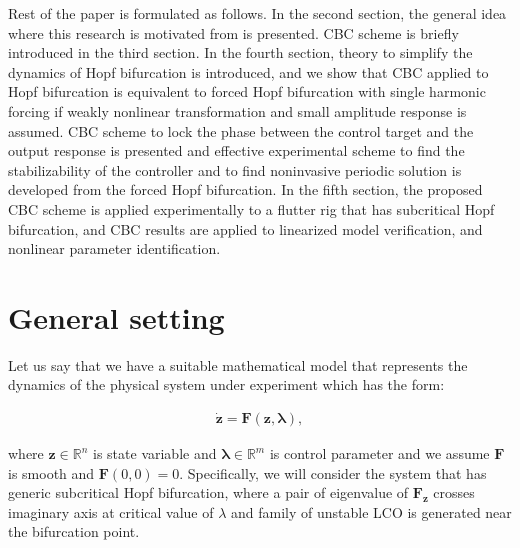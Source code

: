 \documentclass[openacc]{rsproca_new}%
\def\real{\mathbb{R}}
\def\vec#1{\ensuremath{\mathbf{#1}}}
\begin{document}
Rest of the paper is formulated as follows. In the second section, the general idea where this research is motivated from is presented. CBC scheme is briefly introduced in the third section. In the fourth section, theory to simplify the dynamics of Hopf bifurcation is introduced, and we show that CBC applied to Hopf bifurcation is equivalent to forced Hopf bifurcation with single harmonic forcing if weakly nonlinear transformation and small amplitude response is assumed. CBC scheme to lock the phase between the control target and the output response is presented and effective experimental scheme to find the stabilizability of the controller and to find noninvasive periodic solution is developed from the forced Hopf bifurcation. In the fifth section, the proposed CBC scheme is applied experimentally to a flutter rig that has subcritical Hopf bifurcation, and CBC results are applied to linearized model verification, and nonlinear parameter identification.

\section{General setting}\label{GS}
Let us say that we have a suitable mathematical model that represents the dynamics of the physical system under experiment which has the form:

\begin{align}\label{eq:gs}
  \dot{\vec{z}} =\vec{F}(\vec{z},\vec{\lambda}),
\end{align}

\noindent where \(\vec{z}\in \real^n\) is state variable and \(\vec{\lambda}\in\real^m\) is control parameter and we assume $\vec{F}$ is smooth and \(\vec{F}(0,0)=0\). Specifically, we will consider the system that has generic subcritical Hopf bifurcation, where a pair of eigenvalue of $\vec{F}_\vec{z}$ crosses imaginary axis at critical value of $\lambda$ and family of unstable LCO is generated near the bifurcation point.
\end{document}
